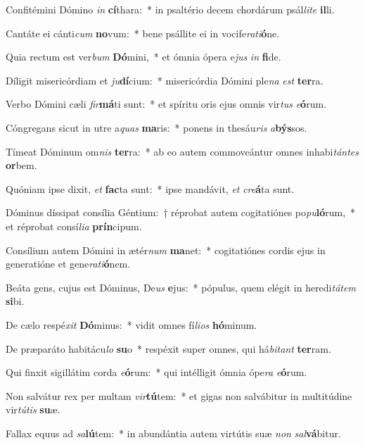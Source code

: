 \item Confitémini Dómino \textit{in} \textbf{cí}thara:~* in psaltério decem chordárum psál\textit{li}\textit{te} \textbf{il}li.
\item Cantáte ei cánti\textit{cum} \textbf{no}vum:~* bene psállite ei in vocife\textit{ra}\textit{ti}\textbf{ó}ne.
\item Quia rectum est ver\textit{bum} \textbf{Dó}mini,~* et ómnia ópera e\textit{jus} \textit{in} \textbf{fi}de.
\item Díligit misericórdiam et \textit{ju}\textbf{dí}cium:~* misericórdia Dómini ple\textit{na} \textit{est} \textbf{ter}ra.
\item Verbo Dómini cæli \textit{fir}\textbf{má}ti sunt:~* et spíritu oris ejus omnis vir\textit{tus} \textit{e}\textbf{ó}rum.
\item Cóngregans sicut in utre a\textit{quas} \textbf{ma}ris:~* ponens in thesáu\textit{ris} \textit{a}\textbf{býs}sos.
\item Tímeat Dóminum om\textit{nis} \textbf{ter}ra:~* ab eo autem commoveántur omnes inhabi\textit{tán}\textit{tes} \textbf{or}bem.
\item Quóniam ipse dixit, \textit{et} \textbf{fac}ta sunt:~* ipse mandávit, \textit{et} \textit{cre}\textbf{á}ta sunt.
\item Dóminus díssipat consília Géntium:~† réprobat autem cogitatiónes po\textit{pu}\textbf{ló}rum,~* et réprobat consí\textit{li}\textit{a} \textbf{prín}cipum.
\item Consílium autem Dómini in ætér\textit{num} \textbf{ma}net:~* cogitatiónes cordis ejus in generatióne et gene\textit{ra}\textit{ti}\textbf{ó}nem.
\item Beáta gens, cujus est Dóminus, De\textit{us} \textbf{e}jus:~* pópulus, quem elégit in heredi\textit{tá}\textit{tem} \textbf{si}bi.
\item De cælo respé\textit{xit} \textbf{Dó}minus:~* vidit omnes fí\textit{li}\textit{os} \textbf{hó}minum.
\item De præparáto habitácu\textit{lo} \textbf{su}o~* respéxit super omnes, qui há\textit{bi}\textit{tant} \textbf{ter}ram.
\item Qui finxit sigillátim corda \textit{e}\textbf{ó}rum:~* qui intélligit ómnia ópe\textit{ra} \textit{e}\textbf{ó}rum.
\item Non salvátur rex per multam \textit{vir}\textbf{tú}tem:~* et gigas non salvábitur in multitúdine vir\textit{tú}\textit{tis} \textbf{su}æ.
\item Fallax equus ad \textit{sa}\textbf{lú}tem:~* in abundántia autem virtútis suæ \textit{non} \textit{sal}\textbf{vá}bitur.
